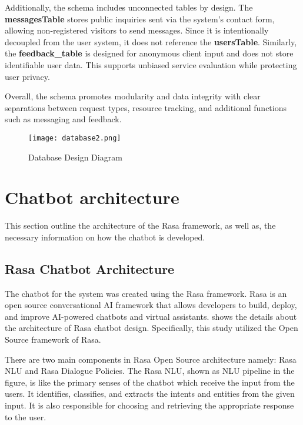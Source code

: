 Additionally, the schema includes unconnected tables by design. The \textbf{messagesTable} stores public inquiries sent via the system's contact form, allowing non-registered visitors to send messages. Since it is intentionally decoupled from the user system, it does not reference the \textbf{usersTable}. Similarly, the \textbf{feedback\_table} is designed for anonymous client input and does not store identifiable user data. This supports unbiased service evaluation while protecting user privacy.

Overall, the schema promotes modularity and data integrity with clear separations between request types, resource tracking, and additional functions such as messaging and feedback.

\newpage

\begin{figure}[h]
	\centering 
	\texttt{[image: database2.png]}
	\caption{Database Design Diagram}
	\label{fig:database}
\end{figure}

\section{Chatbot architecture}

This section outline the architecture of the Rasa framework, as well as, the necessary information on how the chatbot is developed.

\subsection{Rasa Chatbot Architecture}

The chatbot for the system was created using the Rasa framework. Rasa is an open source conversational AI framework that allows developers to build, deploy, and improve AI-powered chatbots and virtual assistants.  shows the details about the architecture of Rasa chatbot design. Specifically, this study utilized the Open Source framework of Rasa.

There are two main components in Rasa Open Source architecture namely: Rasa NLU and Rasa Dialogue Policies. The Rasa NLU, shown as NLU pipeline in the figure, is like the primary senses of the chatbot which receive the input from the users. It identifies, classifies, and extracts the intents and entities from the given input. It is also responsible for choosing and retrieving the appropriate response to the user. 

